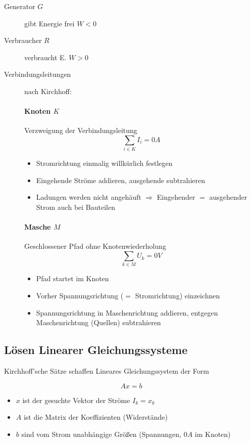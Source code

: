 \begin{description}
  \item[Generator $G$] gibt Energie frei $W < 0$
  \item[Verbraucher $R$] verbraucht E. $W > 0$
  \item[Verbindungsleitungen] nach Kirchhoff:
    \paragraph{Knoten $K$} Verzweigung der Verbindungsleitung
    $$\sum_{i \in K} I_i = 0 A$$

    \begin{itemize}
      \item Stromrichtung einmalig willkürlich festlegen
      \item Eingehende Ströme addieren, ausgehende subtrahieren
      \item Ladungen werden nicht angehäuft $\Rightarrow$ Eingehender $=$ ausgehender Strom auch bei Bauteilen
    \end{itemize}

    \paragraph{Masche $M$} Geschlossener Pfad ohne Knotenwiederholung
    $$\sum_{k \in M} U_k = 0 V$$

    \begin{itemize}
      \item Pfad startet im Knoten
      \item Vorher Spannungsrichtung ($=$ Stromrichtung) einzeichnen
      \item Spannungsrichtung in Maschenrichtung addieren, entgegen Maschenrichtung (Quellen) subtrahieren
    \end{itemize}
\end{description}

\subsection{Lösen Linearer Gleichungssysteme}

Kirchhoff'sche Sätze schaffen Lineares Gleichungssystem der Form

$$A x = b$$

\begin{itemize}
  \item $x$ ist der gesuchte Vektor der Ströme $I_k = x_k$
  \item $A$ ist die Matrix der Koeffizienten (Widerstände)
  \item $b$ sind vom Strom unabhängige Grö\ss en (Spannungen, $0A$ im Knoten)
\end{itemize}

